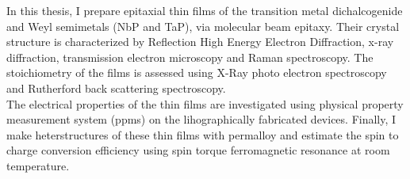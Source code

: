 
In this thesis, I prepare epitaxial thin films of the transition metal dichalcogenide
\nbse and Weyl semimetals (NbP and TaP), via molecular beam epitaxy. Their crystal structure
is characterized by Reflection High Energy Electron Diffraction, x-ray diffraction, 
transmission electron microscopy and Raman spectroscopy. The stoichiometry of the films  
is assessed using X-Ray photo electron spectroscopy and Rutherford back scattering spectroscopy.
\\

The electrical properties of the thin films are investigated using physical property
measurement system (ppms) on the lihographically fabricated devices. Finally, I make 
heterstructures of these thin films with permalloy and estimate the spin to charge conversion
efficiency using spin torque ferromagnetic resonance at room temperature.

